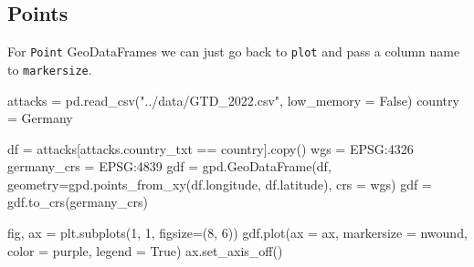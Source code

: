 \documentclass[
  letterpaper,
  DIV=11,
  numbers=noendperiod]{scrreprt}
\newenvironment{Shaded}{\begin{snugshade}}{\end{snugshade}}
\newcommand{\DecValTok}[1]{\textcolor[rgb]{0.68,0.00,0.00}{#1}}
\newcommand{\NormalTok}[1]{\textcolor[rgb]{0.00,0.23,0.31}{#1}}
\newcommand{\OperatorTok}[1]{\textcolor[rgb]{0.37,0.37,0.37}{#1}}
\newcommand{\StringTok}[1]{\textcolor[rgb]{0.13,0.47,0.30}{#1}}
\newcommand{\VariableTok}[1]{\textcolor[rgb]{0.07,0.07,0.07}{#1}}
\begin{document}
\hypertarget{points}{%
\subsection{Points}\label{points}}

For \texttt{Point} GeoDataFrames we can just go back to \texttt{plot}
and pass a column name to \texttt{markersize}.

\begin{Shaded}
\begin{Highlighting}[]
\NormalTok{attacks }\OperatorTok{=}\NormalTok{ pd.read\_csv(}\StringTok{"../data/GTD\_2022.csv"}\NormalTok{, low\_memory }\OperatorTok{=} \VariableTok{False}\NormalTok{)}
\NormalTok{country }\OperatorTok{=} \StringTok{\textquotesingle{}Germany\textquotesingle{}}

\NormalTok{df }\OperatorTok{=}\NormalTok{ attacks[attacks.country\_txt }\OperatorTok{==}\NormalTok{ country].copy()}
\NormalTok{wgs }\OperatorTok{=} \StringTok{\textquotesingle{}EPSG:4326\textquotesingle{}}
\NormalTok{germany\_crs }\OperatorTok{=} \StringTok{\textquotesingle{}EPSG:4839\textquotesingle{}}
\NormalTok{gdf }\OperatorTok{=}\NormalTok{ gpd.GeoDataFrame(df, geometry}\OperatorTok{=}\NormalTok{gpd.points\_from\_xy(df.longitude, df.latitude), crs }\OperatorTok{=}\NormalTok{ wgs)}
\NormalTok{gdf }\OperatorTok{=}\NormalTok{ gdf.to\_crs(germany\_crs)}
\end{Highlighting}
\end{Shaded}

\begin{Shaded}
\begin{Highlighting}[]
\NormalTok{fig, ax }\OperatorTok{=}\NormalTok{ plt.subplots(}\DecValTok{1}\NormalTok{, }\DecValTok{1}\NormalTok{, figsize}\OperatorTok{=}\NormalTok{(}\DecValTok{8}\NormalTok{, }\DecValTok{6}\NormalTok{))}
\NormalTok{gdf.plot(ax }\OperatorTok{=}\NormalTok{ ax, markersize }\OperatorTok{=} \StringTok{\textquotesingle{}nwound\textquotesingle{}}\NormalTok{, color }\OperatorTok{=} \StringTok{\textquotesingle{}purple\textquotesingle{}}\NormalTok{, legend }\OperatorTok{=} \VariableTok{True}\NormalTok{)}
\NormalTok{ax.set\_axis\_off()}
\end{Highlighting}
\end{Shaded}
\end{document}
